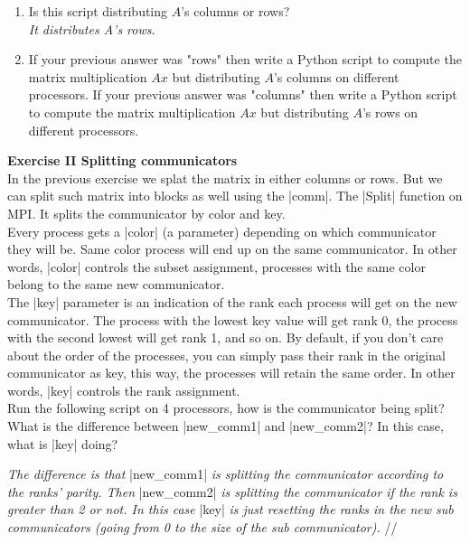 \documentclass[11pt]{article}
\begin{document}


\begin{enumerate}
    \item Is this script distributing $A$'s columns or rows? \\
    \textit{It distributes A's rows}.
    \item If your previous answer was "rows" then write a Python script to compute the matrix multiplication $Ax$ but distributing $A$'s columns on different processors. If your previous answer was "columns" then write a Python script to compute the matrix multiplication $Ax$ but distributing $A$'s rows on different processors. \\
    
\end{enumerate}

\bigskip

{\bf{Exercise II Splitting communicators}}\\

In the previous exercise we splat the matrix in either columns or rows. But we can split such matrix into blocks as well using the |comm|. The |Split| function on MPI. It splits the communicator by color and key. \\

Every process gets a |color| (a parameter) depending on which communicator they will be. Same color process will end up on the same communicator. In other words, |color| controls the subset assignment, processes with the same color belong to the same new communicator. \\

The |key| parameter is an indication of the rank each process will get on the new communicator. The process with the lowest key value will get rank 0, the process with the second lowest will get rank 1, and so on. By default, if you don't care about the order of the processes, you can simply pass their rank in the original communicator as key, this way, the processes will retain the same order. In other words, |key| controls the rank assignment.\\

Run the following script on 4 processors, how is the communicator being split? What is the difference between |new_comm1| and |new_comm2|? In this case, what is |key| doing?

 
 
 \textit{The difference is that } |new_comm1| \textit{is splitting the communicator according to the ranks' parity. Then} |new_comm2| \textit{is splitting the communicator if the rank is greater than 2 or not. In this case} |key| \textit{is just resetting the ranks in the new sub communicators (going from 0 to the size of the sub communicator).} //
 
\end{document}
